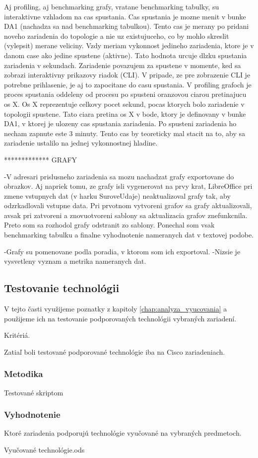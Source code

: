 Aj profiling, aj benchmarking grafy, vratane benchmarking tabulky, su interaktivne
vzhladom na cas spustania.
Cas spustania je mozne menit v bunke DA1 (nachadza sa nad benchmarking tabulkou).
Tento cas je merany po pridani noveho zariadenia do topologie a nie uz existujuceho,
co by mohlo skreslit (vylepsit) merane veliciny. Vzdy meriam vykonnost jedineho 
zariadenia, ktore je v danom case ako jedine spustene (aktivne).
Tato hodnota urcuje dlzku spustania zariadenia v sekundach. Zariadenie povazujem za
spustene v momente, ked sa zobrazi interaktivny prikazovy riadok (CLI). V pripade,
ze pre zobrazenie CLI je potrebne prihlasenie, je aj to zapocitane do casu spustania.
V profiling grafoch je proces spustania oddeleny od procesu po spusteni oranzovou
ciarou pretinajucu os X. Os X reprezentuje celkovy pocet sekund, pocas ktorych bolo
zariadenie v topologii spustene. Tato ciara pretina os X v bode, ktory je definovany
 v bunke DA1, v ktorej je ulozeny cas spustania zariadenia.
Po spusteni zariadenia ho necham zapnute este 3 minuty. Tento cas by teoreticky mal 
stacit na to, aby sa zariadenie ustalilo na jednej vykonnostnej hladine.


*************
GRAFY

-V adresari prislusneho zariadenia sa mozu nachadzat grafy exportovane
 do obrazkov.
 Aj napriek tomu, ze grafy isli vygenerovat na prvy krat, LibreOffice
 pri zmene vstupnych dat (v harku SuroveUdaje) neaktualizoval grafy tak,
 aby odzrkadlovali vstupne data. Pri prvotnom vytvoreni grafov sa grafy
 aktualizovali, avsak pri zatvoreni a znovuotvoreni sablony sa aktualizacia
 grafov znefunkcnila. Preto som sa rozhodol grafy odstranit zo sablony.
 Ponechal som vsak benchmarking tabulku a finalne vyhodnotenie nameranych
 dat v textovej podobe.

-Grafy su pomenovane podla poradia, v ktorom som ich exportoval.
-Nizsie je vysvetleny vyznam a metrika nameranych dat.







\subsection{Testovanie technológii}
\label{chap:testovanie_technologii}

V tejto časti využijeme poznatky z kapitoly \ref{chap:analyza_vyucovania} a použijeme ich na testovanie podporovaných technológii vybraných zariadení.

Kritériá.

Zatiaľ boli testované podporované technológie iba na Cisco zariadeniach.

\subsubsection{Metodika}

Testované skriptom

\subsubsection{Vyhodnotenie}

Ktoré zariadenia podporujú technológie vyučované na vybraných predmetoch.

Vyučované technológie.ods